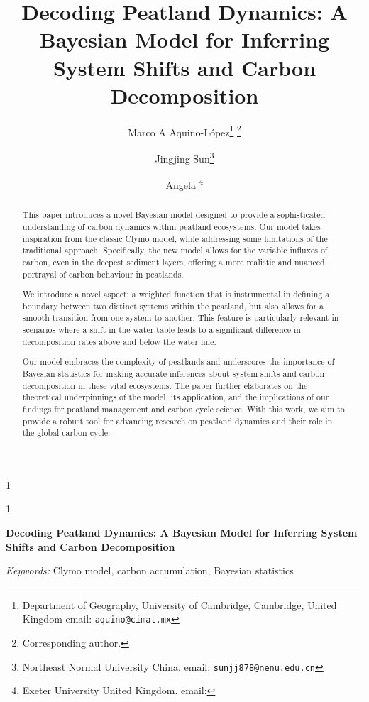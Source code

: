 \documentclass [10pt] {article}
\date{ }
\newcommand{\blind}{1}
\newcommand{\papertitle}{
	Decoding Peatland Dynamics: A Bayesian Model for Inferring System Shifts and Carbon Decomposition
}
\begin{document}
	\def\spacingset#1{\renewcommand{\baselinestretch}%
		{#1}\small\normalsize} \spacingset{1}
	\blind
	{
		\title{\textbf{\papertitle}}

		\author{Marco A Aquino-L\'opez\thanks{
				Department of Geography, University of Cambridge, 
				Cambridge, United Kingdom
				email: \texttt{aquino@cimat.mx} } \thanks{Corresponding author.}
					\and
			Jingjing Sun\thanks{
				Northeast Normal University
				China. 
				email: \texttt{sunjj878@nenu.edu.cn}}
					\and
			Angela \thanks{
				Exeter University
				United Kingdom.
				email: \texttt{}  }
			}
		\maketitle
	} \fi

	\blind
	{
		\bigskip
		\bigskip
		\bigskip
		\begin{center}
			{\LARGE\bf \papertitle}
		\end{center}
		\medskip
	} \fi
\bigskip

\begin{abstract}
This paper introduces a novel Bayesian model designed to provide a sophisticated understanding of carbon dynamics within peatland ecosystems. Our model takes inspiration from the classic Clymo model, while addressing some limitations of the traditional approach. Specifically, the new model allows for the variable influxes of carbon, even in the deepest sediment layers, offering a more realistic and nuanced portrayal of carbon behaviour in peatlands.

We introduce a novel aspect: a weighted function that is instrumental in defining a boundary between two distinct systems within the peatland, but also allows for a smooth transition from one system to another. This feature is particularly relevant in scenarios where a shift in the water table leads to a significant difference in decomposition rates above and below the water line.

	Our model embraces the complexity of peatlands and underscores the importance of Bayesian statistics for making accurate inferences about system shifts and carbon decomposition in these vital ecosystems. The paper further elaborates on the theoretical underpinnings of the model, its application, and the implications of our findings for peatland management and carbon cycle science. With this work, we aim to provide a robust tool for advancing research on peatland dynamics and their role in the global carbon cycle. 

\end{abstract}
	\noindent%
	{\it Keywords:} Clymo model, carbon accumulation, Bayesian statistics	\vfill
	\newpage
	\spacingset{1.45} %
\end{document}
